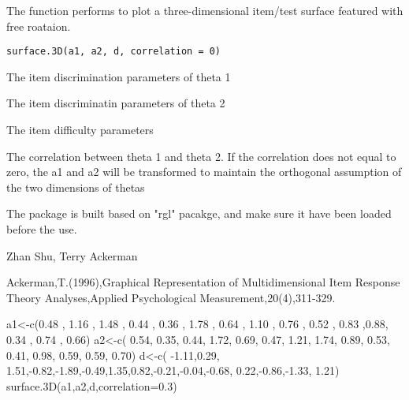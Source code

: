 \begin{Description}\relax
The function performs to plot a three-dimensional item/test surface featured with free roataion.
\end{Description}
\begin{Usage}
\begin{verbatim}
surface.3D(a1, a2, d, correlation = 0)
\end{verbatim}
\end{Usage}
\begin{Arguments}
\begin{ldescription}
\item[\code{a1}] The item discrimination parameters of theta 1 
\item[\code{a2}] The item discriminatin parameters of theta 2 
\item[\code{d}] The item difficulty parameters 
\item[\code{correlation}] The correlation between theta 1 and theta 2. If the correlation does not equal to zero, the a1 and a2 will be transformed to maintain the orthogonal assumption of the two dimensions of thetas 
\end{ldescription}
\end{Arguments}
\begin{Details}\relax
The package is built based on "rgl" pacakge, and make sure it have been loaded before the use.
\end{Details}
\begin{Author}\relax
Zhan Shu, Terry Ackerman
\end{Author}
\begin{References}\relax
Ackerman,T.(1996),Graphical Representation of Multidimensional Item Response Theory Analyses,Applied Psychological Measurement,20(4),311-329.
\end{References}
\begin{Examples}
\begin{ExampleCode}
a1<-c(0.48 , 1.16 , 1.48 , 0.44 , 0.36 , 1.78 , 0.64 , 1.10 , 0.76 , 0.52 , 0.83 ,0.88, 0.34 , 0.74 , 0.66)
a2<-c( 0.54, 0.35, 0.44, 1.72, 0.69, 0.47, 1.21, 1.74, 0.89, 0.53, 0.41, 0.98, 0.59, 0.59, 0.70)
d<-c( -1.11,0.29, 1.51,-0.82,-1.89,-0.49,1.35,0.82,-0.21,-0.04,-0.68, 0.22,-0.86,-1.33, 1.21)
surface.3D(a1,a2,d,correlation=0.3)
\end{ExampleCode}
\end{Examples}

